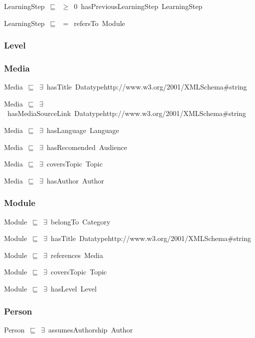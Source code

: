 \documentclass{article}
\begin{document}
LearningStep~\ensuremath{\sqsubseteq}~\ensuremath{\geq}~0~hasPreviousLearningStep~LearningStep~

LearningStep~\ensuremath{\sqsubseteq}~\ensuremath{=}~refersTo~Module~

\subsubsection*{Level}

\subsubsection*{Media}

Media~\ensuremath{\sqsubseteq}~\ensuremath{\exists}~hasTitle~Datatypehttp://www.w3.org/2001/XMLSchema#string~

Media~\ensuremath{\sqsubseteq}~\ensuremath{\exists}~hasMediaSourceLink~Datatypehttp://www.w3.org/2001/XMLSchema#string~

Media~\ensuremath{\sqsubseteq}~\ensuremath{\exists}~hasLanguage~Language~

Media~\ensuremath{\sqsubseteq}~\ensuremath{\exists}~hasRecomended~Audience~

Media~\ensuremath{\sqsubseteq}~\ensuremath{\exists}~coversTopic~Topic~

Media~\ensuremath{\sqsubseteq}~\ensuremath{\exists}~hasAuthor~Author~

\subsubsection*{Module}

Module~\ensuremath{\sqsubseteq}~\ensuremath{\exists}~belongTo~Category~

Module~\ensuremath{\sqsubseteq}~\ensuremath{\exists}~hasTitle~Datatypehttp://www.w3.org/2001/XMLSchema#string~

Module~\ensuremath{\sqsubseteq}~\ensuremath{\exists}~references~Media~

Module~\ensuremath{\sqsubseteq}~\ensuremath{\exists}~coversTopic~Topic~

Module~\ensuremath{\sqsubseteq}~\ensuremath{\exists}~hasLevel~Level~

\subsubsection*{Person}

Person~\ensuremath{\sqsubseteq}~\ensuremath{\exists}~assumesAuthorship~Author~
\end{document}
